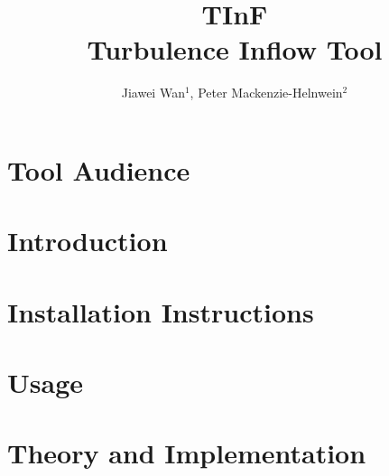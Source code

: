 \documentclass{simcenterdocumentation}
\begin{document}
\title{TInF\\ \Large Turbulence Inflow Tool}
\author{Jiawei Wan$^{1}$, Peter Mackenzie-Helnwein$^2$}

\hypersetup{pageanchor=false}
\maketitle
\copyrightpage
\acknowledgments

\hypersetup{pageanchor=true}
\begin{frontmatter}

\pagestyle{plain}
{
  \renewcommand{\thispagestyle}[1]{}
  \tableofcontents
  \clearpage
  \listoffigures
}

\end{frontmatter}
\pagestyle{somewhatsimple}

\chapter{Tool Audience}


\chapter{Introduction}


\chapter{Installation Instructions}


\chapter{Usage}


\chapter{Theory and Implementation}
  
\end{document}
